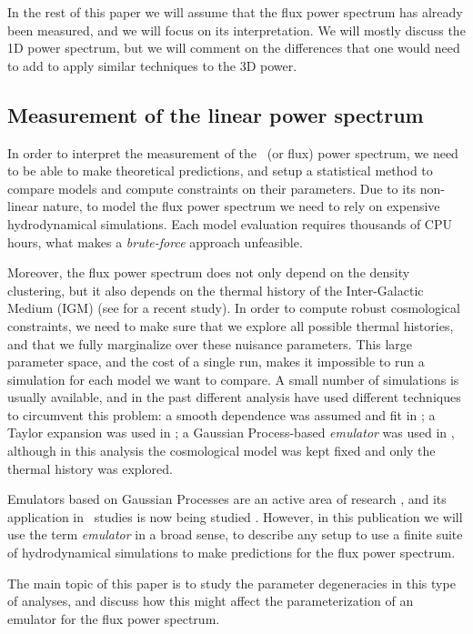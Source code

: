 In the rest of this paper we will assume that the flux power spectrum
has already been measured, and we will focus on its interpretation.
We will mostly discuss the 1D power spectrum, but we will comment on the
differences that one would need to add to apply similar techniques to the
3D power.


\subsection{Measurement of the linear power spectrum}

In order to interpret the measurement of the \lya\ (or flux) power spectrum,
we need to be able to make theoretical predictions, and setup a statistical
method to compare models and compute constraints on their parameters.
Due to its non-linear nature, to model the flux power
spectrum we need to rely on expensive hydrodynamical simulations.
Each model evaluation requires thousands of CPU hours, what makes a
\textit{brute-force} approach unfeasible.

Moreover, the flux power spectrum does not only depend on the density
clustering, but it also depends on the thermal history of the
Inter-Galactic Medium (IGM) (see \cite{Walther2018b} for a recent study).
In order to compute robust cosmological constraints, we need to make sure
that we explore all possible thermal histories, and that we fully marginalize
over these nuisance parameters.
This large parameter space, and the cost of a single run, makes it impossible
to run a simulation for each model we want to compare.
A small number of simulations is usually available, and in the past different
analysis have used different techniques to circumvent this problem:
a smooth dependence was assumed and fit in \cite{McDonald2005a};
a Taylor expansion was used in \cite{Palanque-Delabrouille2013};
a Gaussian Process-based \textit{emulator} was used in
\cite{Walther2018a,Walther2018b}, although in this analysis the cosmological
model was kept fixed and only the thermal history was explored.

Emulators based on Gaussian Processes are an active area of research
\cite{Heitmann2009,Heitmann2014,SLAC2018}, and its application in \lya\
studies is now being studied \cite{Walther2018a,Bird2018,Rogers2018c}.
However, in this publication we will use the term \textit{emulator} in a broad
sense, to describe any setup to use a finite suite of hydrodynamical
simulations to make predictions for the flux power spectrum.

The main topic of this paper is to study the parameter degeneracies in this
type of analyses, and discuss how this might affect the parameterization of
an emulator for the flux power spectrum.

